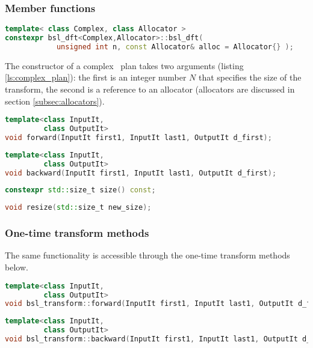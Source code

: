 \subsubsection*{Member functions}
\begin{lstlisting}[language=C++,caption=Complex plan constructor.,label=ls:complex_plan]
template< class Complex, class Allocator >
constexpr bsl_dft<Complex,Allocator>::bsl_dft(
            unsigned int n, const Allocator& alloc = Allocator{} );
\end{lstlisting}
The constructor of a complex \dft\ plan takes two arguments (listing
\ref{ls:complex_plan}): the first is an integer number $N$ that specifies the size of
the transform, the second is a
reference to an allocator (allocators are discussed in section
\ref{subsec:allocators}).
\begin{lstlisting}[language=C++,caption=Complex plan forward function.]
template<class InputIt,
         class OutputIt>
void forward(InputIt first1, InputIt last1, OutputIt d_first);
\end{lstlisting}
\begin{lstlisting}[language=C++,caption=Complex plan backward function.]
template<class InputIt,
         class OutputIt>
void backward(InputIt first1, InputIt last1, OutputIt d_first);
\end{lstlisting}
\begin{lstlisting}[language=C++,caption=Complex plan size.]
constexpr std::size_t size() const;
\end{lstlisting}
\begin{lstlisting}[language=C++,caption=Resize.]
void resize(std::size_t new_size);
\end{lstlisting}

\subsubsection*{One-time transform methods}
The same functionality is accessible through the one-time transform methods
below.
\begin{lstlisting}[language=C++,caption=Forward complex transform.]
template<class InputIt,
         class OutputIt>
void bsl_transform::forward(InputIt first1, InputIt last1, OutputIt d_first);
\end{lstlisting}
\begin{lstlisting}[language=C++,caption=Backward complex transform.]
template<class InputIt,
         class OutputIt>
void bsl_transform::backward(InputIt first1, InputIt last1, OutputIt d_first);
\end{lstlisting}

